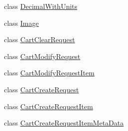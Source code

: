\begin{DoxyCompactItemize}
\begin{DoxyCompactList}\small\item\em \end{DoxyCompactList}\item 
class \hyperlink{class_price___comparison_1_1amazon_1_1ecs_1_1_decimal_with_units}{Decimal\-With\-Units}
\begin{DoxyCompactList}\small\item\em \end{DoxyCompactList}\item 
class \hyperlink{class_price___comparison_1_1amazon_1_1ecs_1_1_image}{Image}
\begin{DoxyCompactList}\small\item\em \end{DoxyCompactList}\item 
class \hyperlink{class_price___comparison_1_1amazon_1_1ecs_1_1_cart_clear_request}{Cart\-Clear\-Request}
\begin{DoxyCompactList}\small\item\em \end{DoxyCompactList}\item 
class \hyperlink{class_price___comparison_1_1amazon_1_1ecs_1_1_cart_modify_request}{Cart\-Modify\-Request}
\begin{DoxyCompactList}\small\item\em \end{DoxyCompactList}\item 
class \hyperlink{class_price___comparison_1_1amazon_1_1ecs_1_1_cart_modify_request_item}{Cart\-Modify\-Request\-Item}
\begin{DoxyCompactList}\small\item\em \end{DoxyCompactList}\item 
class \hyperlink{class_price___comparison_1_1amazon_1_1ecs_1_1_cart_create_request}{Cart\-Create\-Request}
\begin{DoxyCompactList}\small\item\em \end{DoxyCompactList}\item 
class \hyperlink{class_price___comparison_1_1amazon_1_1ecs_1_1_cart_create_request_item}{Cart\-Create\-Request\-Item}
\begin{DoxyCompactList}\small\item\em \end{DoxyCompactList}\item 
class \hyperlink{class_price___comparison_1_1amazon_1_1ecs_1_1_cart_create_request_item_meta_data}{Cart\-Create\-Request\-Item\-Meta\-Data}

\end{DoxyCompactItemize}
